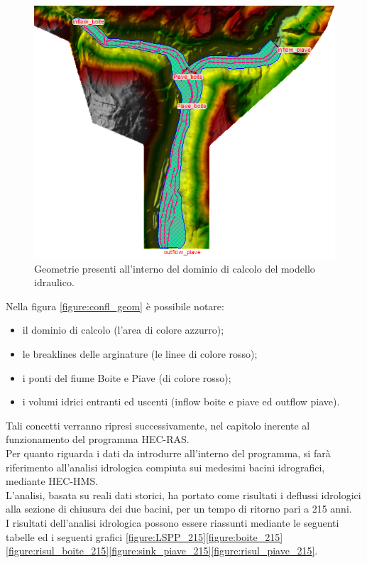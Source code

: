 \begin{figure}[htb] \centering
\includegraphics[scale=0.7]{immagini/confl_geom.PNG}
\caption{Geometrie presenti all'interno del dominio di calcolo del modello idraulico.}
\label{figure:confl_geom}    
\end{figure}
Nella figura \eqref{figure:confl_geom} è possibile notare:
\begin{itemize}
    \item il dominio di calcolo (l'area di colore azzurro);
    \item le breaklines delle arginature (le linee di colore rosso);
    \item i ponti del fiume Boite e Piave (di colore rosso);
    \item i volumi idrici entranti ed uscenti (inflow boite e piave ed outflow piave).
\end{itemize}
Tali concetti verranno ripresi successivamente, nel capitolo inerente al funzionamento del programma HEC-RAS.\\
Per quanto riguarda i dati da introdurre all'interno del programma, si farà riferimento all'analisi idrologica compiuta sui medesimi bacini idrografici, mediante HEC-HMS.\\
L'analisi, basata su reali dati storici, ha portato come risultati i deflussi idrologici alla sezione di chiusura dei due bacini, per un tempo di ritorno pari a 215 anni.\\
I risultati dell'analisi idrologica possono essere riassunti mediante le seguenti tabelle ed i seguenti grafici \eqref{figure:LSPP_215}\eqref{figure:boite_215}\eqref{figure:risul_boite_215}\eqref{figure:sink_piave_215}\eqref{figure:risul_piave_215}.


